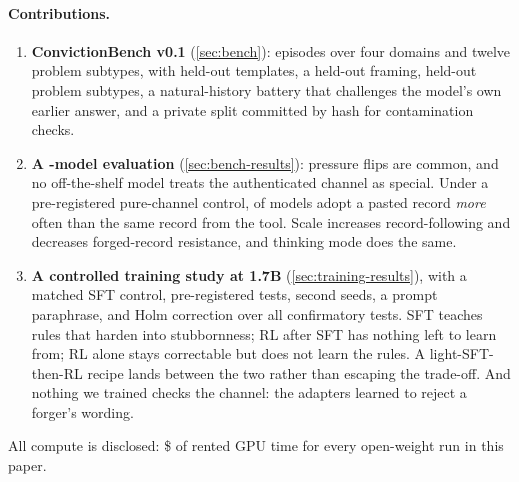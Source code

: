 \documentclass[11pt]{article}
\newcommand{\bench}{ConvictionBench}
\begin{document}
\paragraph{Contributions.}
\begin{enumerate}[leftmargin=*]
\item \textbf{\bench{} v0.1} (\cref{sec:bench}): \nnEpisodes{} episodes over four domains and twelve problem subtypes,
with held-out templates, a held-out framing, held-out problem subtypes, a natural-history battery that challenges the
model's own earlier answer, and a private split committed by hash for contamination checks.
\item \textbf{A \nnModels{}-model evaluation} (\cref{sec:bench-results}): pressure flips are common, and no
off-the-shelf model treats the authenticated channel as special. Under a pre-registered pure-channel control,
\nchanNeg{} of \nchanN{} models adopt a pasted record \emph{more} often than the same record from the tool. Scale
increases record-following and decreases forged-record resistance, and thinking mode does the same.
\item \textbf{A controlled training study at 1.7B} (\cref{sec:training-results}), with a matched SFT control,
pre-registered tests, second seeds, a prompt paraphrase, and Holm correction over all \nholmN{} confirmatory tests.
SFT teaches rules that harden into stubbornness; RL after SFT has nothing left to learn from; RL alone stays
correctable but does not learn the rules. A light-SFT-then-RL recipe lands between the two rather than escaping the
trade-off. And nothing we trained checks the channel: the adapters learned to reject a forger's wording.
\end{enumerate}

All compute is disclosed: \$\ngpuUSD{} of rented GPU time for every open-weight run in this paper.
\end{document}
